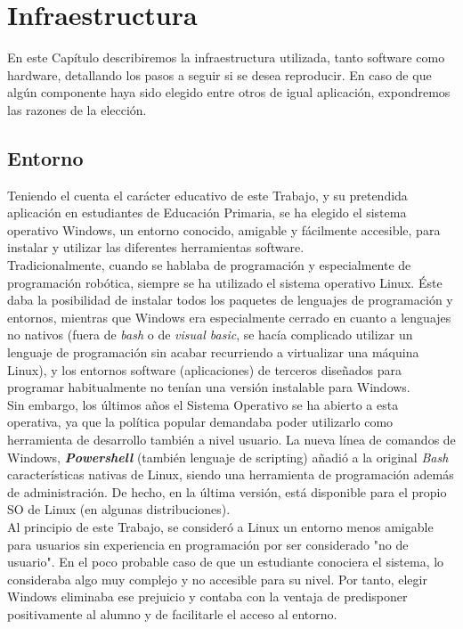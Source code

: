 \chapter{Infraestructura}
\label{cap:infra}

En este Capítulo describiremos la infraestructura utilizada, tanto software como hardware, detallando los pasos a seguir si se desea reproducir. En caso de que algún componente haya sido elegido entre otros de igual aplicación, expondremos las razones de la elección.


\section{Entorno}\label{sec:entorno}
Teniendo el cuenta el carácter educativo de este Trabajo, y su pretendida aplicación en estudiantes de Educación Primaria, se ha elegido el sistema operativo Windows, un entorno conocido, amigable y fácilmente accesible, para instalar y utilizar las diferentes herramientas software. \\
Tradicionalmente, cuando se hablaba de programación y especialmente de programación robótica, siempre se ha utilizado el sistema operativo Linux. Éste daba la posibilidad de instalar todos los paquetes de lenguajes de programación y entornos, mientras que Windows era especialmente cerrado en cuanto a lenguajes no nativos (fuera de \textit{bash} o de \textit{visual basic}, se hacía complicado utilizar un lenguaje de programación sin acabar recurriendo a virtualizar una máquina Linux), y los entornos software (aplicaciones) de terceros diseñados para programar habitualmente no tenían una versión instalable para Windows. \\
Sin embargo, los últimos años el Sistema Operativo se ha abierto a esta operativa, ya que la política popular demandaba poder utilizarlo como herramienta de desarrollo también a nivel usuario. La nueva línea de comandos de Windows, \textbf{\textit{Powershell}} (también lenguaje de scripting) añadió a la original \textit{Bash} características nativas de Linux, siendo una herramienta de programación además de administración. De hecho, en la última versión, está disponible para el propio SO de Linux (en algunas distribuciones). \\
Al principio de este Trabajo, se consideró a Linux un entorno menos amigable para usuarios sin experiencia en programación por ser considerado "no de usuario". En el poco probable caso de que un estudiante conociera el sistema, lo consideraba algo muy complejo y no accesible para su nivel. Por tanto, elegir Windows eliminaba ese prejuicio y contaba con la ventaja de predisponer positivamente al alumno y de facilitarle el acceso al entorno. 

